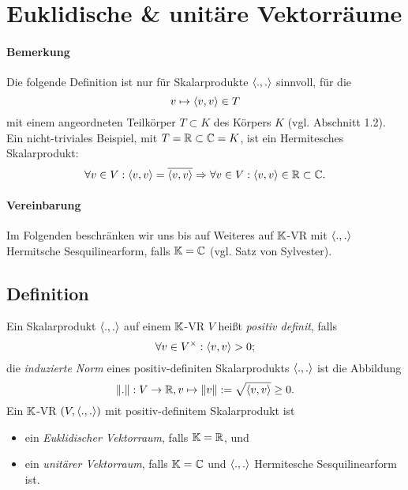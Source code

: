\section{Euklidische \& unitäre Vektorräume}


\paragraph{Bemerkung}
	Die folgende Definition ist nur für Skalarprodukte $ \langle .,. \rangle $ sinnvoll, für die
		\[ v\mapsto \langle  v,v \rangle \in T \]
	mit einem angeordneten Teilkörper $ T \subset K $ des Körpers $ K $ (vgl. Abschnitt 1.2).
	Ein nicht-triviales Beispiel, mit $ T=\mathbb{R}\subset \mathbb{C} = K $, ist ein Hermitesches Skalarprodukt:
		\[ \forall v\in V: \langle  v,v \rangle = \overline{\langle  v,v \rangle} \Rightarrow \forall v\in V: \langle  v,v \rangle \in \mathbb{R}\subset \mathbb{C}. \]
\paragraph{Vereinbarung}
	Im Folgenden beschränken wir uns bis auf Weiteres auf $ \mathbb{K} $-VR mit $ \langle .,. \rangle $ Hermitsche Sesquilinearform, falls $ \mathbb{K} = \mathbb{C} $ (vgl. Satz von Sylvester).
	
\subsection{Definition}   
\begin{Definition}
	Ein Skalarprodukt $ \langle .,. \rangle $ auf einem $ \mathbb{K} $-VR $ V $ heißt \emph{positiv definit}, falls
		\[ \forall v\in V^\times:\langle  v,v \rangle >0; \]
	die \emph{induzierte Norm} eines positiv-definiten Skalarprodukts $ \langle .,. \rangle $ ist die Abbildung
		\[ \|.\|: V\to \mathbb{R}, v\mapsto \|v\| := \sqrt{\langle  v,v \rangle}\geq 0. \]
	Ein $ \mathbb{K} $-VR $ (V,\langle .,. \rangle ) $ mit positiv-definitem Skalarprodukt ist
		\begin{itemize}
			\item ein \emph{Euklidischer Vektorraum}, falls $ \mathbb{K}=\mathbb{R} $, und
			\item ein \emph{unitärer Vektorraum}, falls $ \mathbb{K} = \mathbb{C} $ und $ \langle .,. \rangle $ Hermitesche Sesquilinearform ist. 
		\end{itemize}
\end{Definition}

